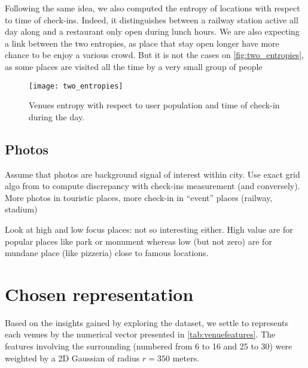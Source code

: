 Following the same idea, we also computed the entropy of locations with
respect to time of check-ins. Indeed, it distinguishes between a railway
station active all day along and a restaurant only open during lunch hours.
We are also expecting a link between the two entropies, as place that stay
open longer have more chance to be enjoy a various crowd. But it is not the
cases on \autoref{fig:two_entropies}, as some places are visited all the time
by a very small group of people

\begin{figure}[hbtp]
\texttt{[image: two\_entropies]}
\caption{Venues entropy with respect to user population and time of check-in
during the day. \label{fig:two_entropies}}
\end{figure}


\subsection{Photos}

Assume that photos are background signal of interest within city. Use exact
grid algo from \autocite{Agarwal2006spatial} to compute discrepancy with
check-ins measurement (and conversely).  More
photos in touristic places, more check-in in “event” places (railway, stadium)

Look at high and low focus places: not so interesting either. High value are
for popular places like park or monument whereas low (but not zero) are for
mundane place (like pizzeria) close to famous locations.

\section{Chosen representation}

Based on the insights gained by exploring the dataset, we settle to represents
each venues by the numerical vector presented in \autoref{tab:venuefeatures}.
The features involving the surrounding (numbered from 6 to 16 and 25 to 30)
were weighted by a 2D Gaussian of radius $r=350$ meters.

